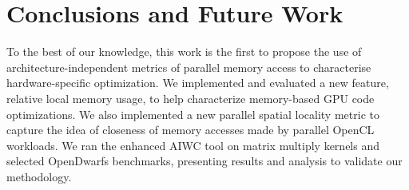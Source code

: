 \documentclass[review=false, sigchi]{acmart}
\begin{document}
	

	
	\section{Conclusions and Future Work} \label{future work}
	
	To the best of our knowledge, this work is the first to propose the use of architecture-independent metrics of parallel memory access to characterise hardware-specific optimization. 
	We implemented and evaluated a new feature, relative local memory usage, to help characterize memory-based GPU code optimizations.
	We also implemented a new parallel spatial locality metric to capture the idea of closeness of memory accesses made by parallel OpenCL workloads.
	We ran the enhanced AIWC tool on matrix multiply kernels and selected OpenDwarfs benchmarks, presenting results and analysis to validate our methodology. 
	
\end{document}
